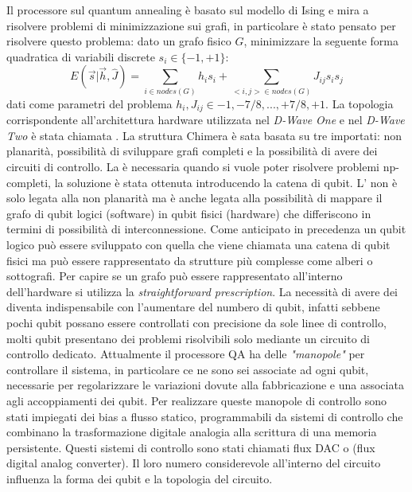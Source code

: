 Il processore sul quantum annealing è basato sul modello di Ising e mira a risolvere problemi di minimizzazione sui grafi, in particolare è stato pensato per risolvere questo problema: dato un grafo fisico $G$, minimizzare la seguente forma quadratica di variabili discrete $s_i \in \{-1, +1\}$:
$$E(\vec{s}|\vec{h}, \hat{J}) = \sum_{i \in nodes(G)} h_i s_i + \sum_{<i,j> \in nodes(G)} J_{ij} s_i s_j$$
dati come parametri del problema $h_i, J_{ij} \in {-1, -7/8, ..., +7/8, +1}$. La topologia corrispondente all'architettura hardware utilizzata nel \textit{D-Wave One} e nel \textit{D-Wave Two} è stata chiamata . La struttura Chimera è sata basata su tre  importati: non planarità, possibilità di sviluppare grafi completi e la possibilità di avere dei circuiti di controllo. La  è necessaria quando si vuole poter risolvere problemi np-completi, la soluzione è stata ottenuta introducendo la catena di qubit. L' non è solo legata alla non planarità ma è anche legata alla possibilità di mappare il grafo di qubit logici (software) in qubit fisici (hardware) che differiscono in termini di possibilità di interconnessione. Come anticipato in precedenza un qubit logico può essere sviluppato con quella che viene chiamata una catena di qubit fisici ma può essere rappresentato da strutture più complesse come alberi o sottografi. Per capire se un grafo può essere rappresentato all'interno dell'hardware si utilizza la \textit{straightforward prescription}.
La necessità di avere dei  diventa indispensabile con l'aumentare del numbero di qubit, infatti sebbene pochi qubit possano essere controllati con precisione da sole linee di controllo, molti qubit presentano dei problemi risolvibili solo mediante un circuito di controllo dedicato. Attualmente il processore QA ha delle \textit{"manopole"} per controllare il sistema, in particolare ce ne sono sei associate ad ogni qubit, necessarie per regolarizzare le variazioni dovute alla fabbricazione e una associata agli accoppiamenti dei qubit. Per realizzare queste manopole di controllo sono stati impiegati dei bias a flusso statico, programmabili da sistemi di controllo che combinano la trasformazione digitale analogia alla scrittura di una memoria persistente. Questi sistemi di controllo sono stati chiamati flux DAC o  (flux digital analog converter). Il loro numero considerevole all'interno del circuito influenza la forma dei qubit e la topologia del circuito.

